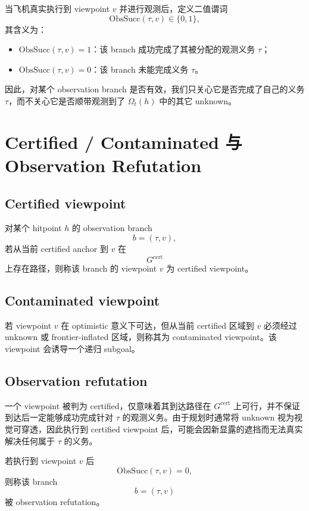 \documentclass[11pt]{ctexart}
\begin{document}
当飞机真实执行到 viewpoint $v$ 并进行观测后，定义二值谓词
\[
\mathrm{ObsSucc}(\tau,v)\in\{0,1\},
\]
其含义为：
\begin{itemize}[leftmargin=2em]
    \item $\mathrm{ObsSucc}(\tau,v)=1$：该 branch 成功完成了其被分配的观测义务 $\tau$；
    \item $\mathrm{ObsSucc}(\tau,v)=0$：该 branch 未能完成义务 $\tau$。
\end{itemize}

因此，对某个 observation branch 是否有效，我们只关心它是否完成了自己的义务 $\tau$，而不关心它是否顺带观测到了 $\Omega_t(h)$ 中的其它 unknown。

\section{Certified / Contaminated 与 Observation Refutation}

\subsection{Certified viewpoint}

对某个 hitpoint $h$ 的 observation branch
\[
b=(\tau,v),
\]
若从当前 certified anchor 到 $v$ 在
\[
G^{\mathrm{cert}}
\]
上存在路径，则称该 branch 的 viewpoint $v$ 为 certified viewpoint。

\subsection{Contaminated viewpoint}

若 viewpoint $v$ 在 optimistic 意义下可达，但从当前 certified 区域到 $v$ 必须经过 unknown 或 frontier-inflated 区域，则称其为 contaminated viewpoint。该 viewpoint 会诱导一个递归 subgoal。

\subsection{Observation refutation}

一个 viewpoint 被判为 certified，仅意味着其到达路径在 $G^{\mathrm{cert}}$ 上可行，并不保证到达后一定能够成功完成针对 $\tau$ 的观测义务。由于规划时通常将 unknown 视为视觉可穿透，因此执行到 certified viewpoint 后，可能会因新显露的遮挡而无法真实解决任何属于 $\tau$ 的义务。

若执行到 viewpoint $v$ 后
\[
\mathrm{ObsSucc}(\tau,v)=0,
\]
则称该 branch
\[
b=(\tau,v)
\]
被 observation refutation。
\end{document}
